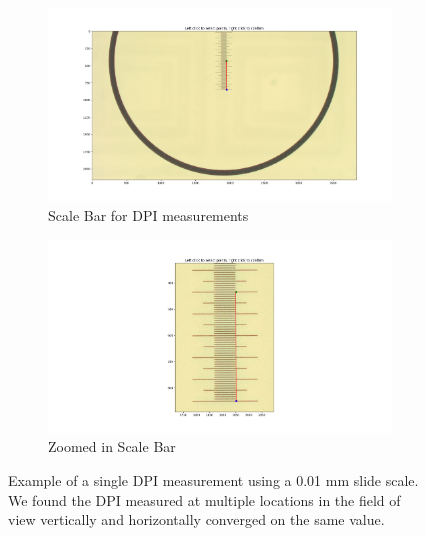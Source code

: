 \documentclass[a4paper,12pt]{article}
\begin{document}
{
\renewcommand{\thefigure}{S\arabic{figure}}
\setcounter{figure}{0}  %

\begin{figure}[htbp]
  \centering
  \begin{subfigure}{.5\textwidth}
    \centering
    \includegraphics[height=0.5\linewidth]{../diagrams/dpi_measurement_whole.png}
    \caption{Scale Bar for DPI measurements}
    \label{fig:dpi_measurement_whole}
  \end{subfigure}%
  \begin{subfigure}{.5\textwidth}
    \centering
    \includegraphics[height=0.5\linewidth]{../diagrams/dpi_measurement_zoomed_2.png}
    \caption{Zoomed in Scale Bar}
    \label{fig:dpi_measurement_zoomed}
  \end{subfigure}
  \caption{Example of a single DPI measurement using a 0.01 mm slide scale. We found the DPI measured at multiple locations in the field of view vertically and horizontally converged on the same value.}
  \label{fig:dpi_measurements}
\end{figure}
}

\renewcommand{\thetable}{S\arabic{table}}



\end{document}
